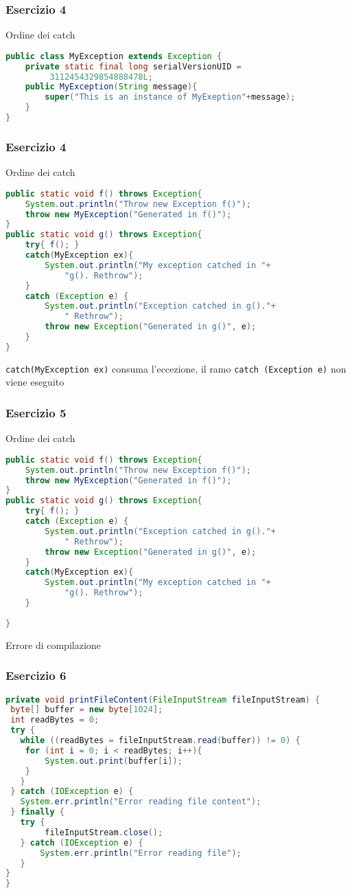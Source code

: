\documentclass{beamer}
\begin{document}
\begin{frame}[fragile]
\frametitle{Esercizio 4}
Ordine dei catch
\begin{lstlisting}[language=Java]
public class MyException extends Exception {
    private static final long serialVersionUID =
         3112454329854888478L;
    public MyException(String message){
        super("This is an instance of MyExeption"+message);
    }
}
\end{lstlisting}
\end{frame}


\begin{frame}[fragile]
\frametitle{Esercizio 4}
Ordine dei catch
\begin{lstlisting}[language=Java]
public static void f() throws Exception{
    System.out.println("Throw new Exception f()");
    throw new MyException("Generated in f()");
}
public static void g() throws Exception{
    try{ f(); }
    catch(MyException ex){
        System.out.println("My exception catched in "+
            "g(). Rethrow");
    }
    catch (Exception e) {
        System.out.println("Exception catched in g()."+
            " Rethrow");
        throw new Exception("Generated in g()", e);
    }
}
\end{lstlisting}
\texttt{catch(MyException ex)} consuma l'eccezione, il ramo \texttt{catch (Exception e)} non viene eseguito
\end{frame}


\begin{frame}[fragile]
\frametitle{Esercizio 5}
Ordine dei catch
\begin{lstlisting}[language=Java]
public static void f() throws Exception{
    System.out.println("Throw new Exception f()");
    throw new MyException("Generated in f()");
}
public static void g() throws Exception{
    try{ f(); }
    catch (Exception e) {
        System.out.println("Exception catched in g()."+
            " Rethrow");
        throw new Exception("Generated in g()", e);
    }
    catch(MyException ex){
        System.out.println("My exception catched in "+
            "g(). Rethrow");
    }
    
}
\end{lstlisting}
Errore di compilazione
\end{frame}


\begin{frame}[fragile]
\frametitle{Esercizio 6}
\begin{lstlisting}[language=Java]
private void printFileContent(FileInputStream fileInputStream) {
 byte[] buffer = new byte[1024];
 int readBytes = 0;
 try {
   while ((readBytes = fileInputStream.read(buffer)) != 0) {
    for (int i = 0; i < readBytes; i++){
        System.out.print(buffer[i]);
    }
   }
 } catch (IOException e) {
   System.err.println("Error reading file content");
 } finally {
   try {
        fileInputStream.close();
   } catch (IOException e) {
       System.err.println("Error reading file");
   }
} 
}
\end{lstlisting}
\end{frame}
\end{document}
